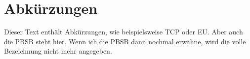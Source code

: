 \chapter{Abkürzungen}
Dieser Text enthält Abkürzungen, wie beispielsweise \ac{TCP} oder \ac{EU}. Aber auch die \ac{PBSB} steht hier.
Wenn ich die \ac{PBSB} dann nochmal erwähne, wird die volle Bezeichnung nicht mehr angegeben.
\begin{acronym}[TCP] %
\end{acronym}
